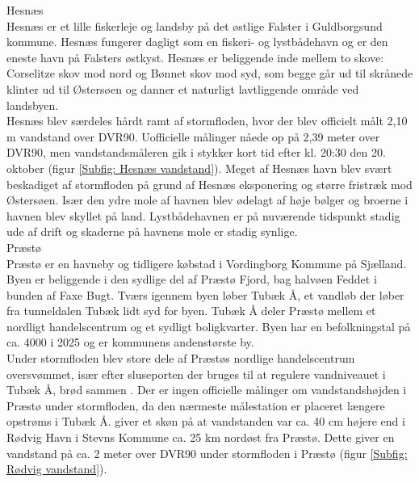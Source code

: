 {\large Hesnæs}\\
Hesnæs er et lille fiskerleje og landsby på det østlige Falster i Guldborgsund kommune. Hesnæs fungerer dagligt som en fiskeri- og lystbådehavn og er den eneste havn på Falsters østkyst. Hesnæs er beliggende inde mellem to skove: Corselitze skov mod nord og Bønnet skov mod syd, som begge går ud til skrånede klinter ud til Østersøen og danner et naturligt lavtliggende område ved landsbyen. \\
Hesnæs blev særdeles hårdt ramt af stormfloden, hvor der blev officielt målt 2,10 m vandstand over DVR90. Uofficielle målinger nåede op på 2,39 meter over DVR90, men vandstandsmåleren gik i stykker kort tid efter kl. 20:30 den 20. oktober (figur \ref{Subfig: Hesnæs vandstand}). Meget af Hesnæs havn blev svært beskadiget af stormfloden på grund af Hesnæs eksponering og større fristræk mod Østersøen. Især den ydre mole af havnen blev ødelagt af høje bølger og broerne i havnen blev skyllet på land. Lystbådehavnen er på nuværende tidspunkt stadig ude af drift og skaderne på havnens mole er stadig synlige.\\

{\large Præstø}\\
Præstø er en havneby og tidligere købstad i Vordingborg Kommune på Sjælland. Byen er beliggende i den sydlige del af Præstø Fjord, bag halvøen Feddet i bunden af Faxe Bugt. Tværs igennem byen løber Tubæk Å, et vandløb der løber fra tunneldalen Tubæk lidt syd for byen. Tubæk Å deler Præstø mellem et nordligt handelscentrum og et sydligt boligkvarter. Byen har en befolkningstal på ca. 4000 i 2025 \citep{danmarks_statistisk_mobile_nodate} og er kommunens andenstørste by.\\
Under stormfloden blev store dele af Præstøs nordlige handelscentrum oversvømmet, især efter sluseporten der bruges til at regulere vandniveauet i Tubæk Å, brød sammen \citep{uldall_sluseport_2023}. Der er ingen officielle målinger om vandstandshøjden i Præstø under stormfloden, da den nærmeste målestation er placeret længere opstrøms i Tubæk Å. \cite{cowi_praesto_2025} giver et skøn på at vandstanden var ca. 40 cm højere end i Rødvig Havn i Stevns Kommune ca. 25 km nordøst fra Præstø. Dette giver en vandstand på ca. 2 meter over DVR90 under stormfloden i Præstø (figur \ref{Subfig: Rødvig vandstand}).